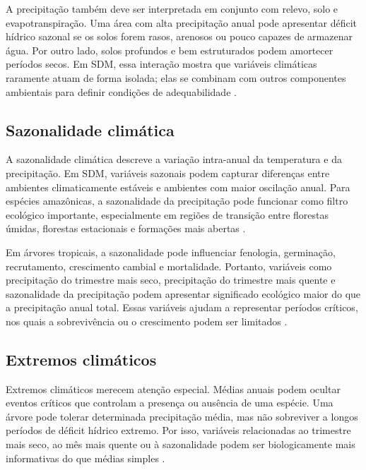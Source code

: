 A precipitação também deve ser interpretada em conjunto com relevo, solo e evapotranspiração. Uma área com alta precipitação anual pode apresentar déficit hídrico sazonal se os solos forem rasos, arenosos ou pouco capazes de armazenar água. Por outro lado, solos profundos e bem estruturados podem amortecer períodos secos. Em SDM, essa interação mostra que variáveis climáticas raramente atuam de forma isolada; elas se combinam com outros componentes ambientais para definir condições de adequabilidade \parencite{franklin2010mapping,guisan2017habitat}.

\subsection{Sazonalidade climática}

A sazonalidade climática descreve a variação intra-anual da temperatura e da precipitação. Em SDM, variáveis sazonais podem capturar diferenças entre ambientes climaticamente estáveis e ambientes com maior oscilação anual. Para espécies amazônicas, a sazonalidade da precipitação pode funcionar como filtro ecológico importante, especialmente em regiões de transição entre florestas úmidas, florestas estacionais e formações mais abertas \parencite{booth2014bioclim,terborgh1973distribution}.

Em árvores tropicais, a sazonalidade pode influenciar fenologia, germinação, recrutamento, crescimento cambial e mortalidade. Portanto, variáveis como precipitação do trimestre mais seco, precipitação do trimestre mais quente e sazonalidade da precipitação podem apresentar significado ecológico maior do que a precipitação anual total. Essas variáveis ajudam a representar períodos críticos, nos quais a sobrevivência ou o crescimento podem ser limitados \parencite{guisan2017habitat,elith2009species}.

\subsection{Extremos climáticos}

Extremos climáticos merecem atenção especial. Médias anuais podem ocultar eventos críticos que controlam a presença ou ausência de uma espécie. Uma árvore pode tolerar determinada precipitação média, mas não sobreviver a longos períodos de déficit hídrico extremo. Por isso, variáveis relacionadas ao trimestre mais seco, ao mês mais quente ou à sazonalidade podem ser biologicamente mais informativas do que médias simples \parencite{phillips2009drought,zurell2020standard}.

